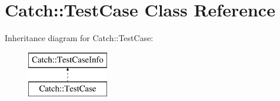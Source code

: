 \hypertarget{class_catch_1_1_test_case}{\section{Catch\-:\-:Test\-Case Class Reference}
\label{class_catch_1_1_test_case}
}
Inheritance diagram for Catch\-:\-:Test\-Case\-:\begin{figure}[H]
\begin{center}
\leavevmode
\includegraphics[height=2.000000cm]{class_catch_1_1_test_case}
\end{center}
\end{figure}
